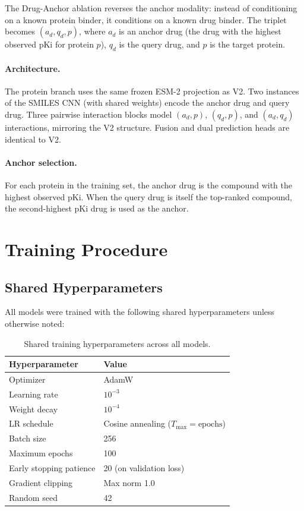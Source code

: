 \documentclass[11pt]{article}
\begin{document}
The Drug-Anchor ablation reverses the anchor modality: instead of conditioning on a known protein binder, it conditions on a known drug binder. The triplet becomes $(a_d, q_d, p)$, where $a_d$ is an anchor drug (the drug with the highest observed pKi for protein $p$), $q_d$ is the query drug, and $p$ is the target protein.

\paragraph{Architecture.}
The protein branch uses the same frozen ESM-2 projection as V2. Two instances of the SMILES CNN (with shared weights) encode the anchor drug and query drug. Three pairwise interaction blocks model $(a_d, p)$, $(q_d, p)$, and $(a_d, q_d)$ interactions, mirroring the V2 structure. Fusion and dual prediction heads are identical to V2.

\paragraph{Anchor selection.}
For each protein in the training set, the anchor drug is the compound with the highest observed pKi. When the query drug is itself the top-ranked compound, the second-highest pKi drug is used as the anchor.

\section{Training Procedure}
\label{sec:training}

\subsection{Shared Hyperparameters}

All models were trained with the following shared hyperparameters unless otherwise noted:

\begin{table}[h]
\centering
\caption{Shared training hyperparameters across all models.}
\label{tab:hyperparams}
\begin{tabular}{ll}
\toprule
Hyperparameter & Value \\
\midrule
Optimizer & AdamW \\
Learning rate & $10^{-3}$ \\
Weight decay & $10^{-4}$ \\
LR schedule & Cosine annealing ($T_{\max} = \mathrm{epochs}$) \\
Batch size & 256 \\
Maximum epochs & 100 \\
Early stopping patience & 20 (on validation loss) \\
Gradient clipping & Max norm 1.0 \\
Random seed & 42 \\
\bottomrule
\end{tabular}
\end{table}
\end{document}
